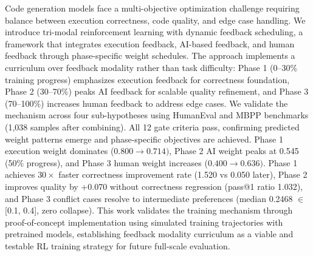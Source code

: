 
Code generation models face a multi-objective optimization challenge requiring balance between execution correctness, code quality, and edge case handling. We introduce tri-modal reinforcement learning with dynamic feedback scheduling, a framework that integrates execution feedback, AI-based feedback, and human feedback through phase-specific weight schedules. The approach implements a curriculum over feedback modality rather than task difficulty: Phase 1 (0--30\% training progress) emphasizes execution feedback for correctness foundation, Phase 2 (30--70\%) peaks AI feedback for scalable quality refinement, and Phase 3 (70--100\%) increases human feedback to address edge cases. We validate the mechanism across four sub-hypotheses using HumanEval and MBPP benchmarks (1,038 samples after combining). All 12 gate criteria pass, confirming predicted weight patterns emerge and phase-specific objectives are achieved. Phase 1 execution weight dominates (0.$800\rightarrow 0.714)$, Phase 2 AI weight peaks at 0.545 (50\% progress), and Phase 3 human weight increases (0.$400\rightarrow 0.636)$. Phase 1 achieves $30\times$ faster correctness improvement rate (1.520 vs 0.050 later), Phase 2 improves quality by +0.070 without correctness regression (pass@1 ratio 1.032), and Phase 3 conflict cases resolve to intermediate preferences (median 0.2468 $\in$ [0.1, 0.4], zero collapse). This work validates the training mechanism through proof-of-concept implementation using simulated training trajectories with pretrained models, establishing feedback modality curriculum as a viable and testable RL training strategy for future full-scale evaluation.
